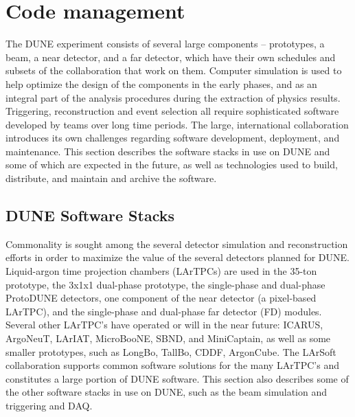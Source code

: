 %

\chapter{Code management} %
\label{chap:codemgt}

The DUNE experiment consists of several large components -- prototypes, a beam, a near detector, and a far detector,
which have their own schedules and subsets of the collaboration that work on them.  Computer simulation is used to
help optimize the design of the components in the early phases, and as an integral part of the analysis procedures
during the extraction of physics results.  Triggering, reconstruction and event selection all require sophisticated
software developed by teams over long time periods.  The large, international
collaboration introduces its own challenges regarding software development, deployment, and maintenance.
This section describes the software stacks in use on DUNE and some of which are expected in the future,
as well as technologies used to build, distribute, and maintain and archive the software.

\section{DUNE Software Stacks}

Commonality is sought among the several detector simulation and reconstruction efforts in order to maximize the
value of the several detectors planned for DUNE.  Liquid-argon time projection chambers (LArTPCs) are used in the 35-ton
prototype, the 3x1x1 dual-phase prototype, the single-phase and dual-phase ProtoDUNE detectors, 
one component of the near detector (a pixel-based
LArTPC), and the single-phase and dual-phase far detector (FD) modules.  Several other LArTPC's have operated or will
in the near future:  ICARUS, ArgoNeuT, LArIAT, MicroBooNE, SBND, and MiniCaptain, as well as some smaller prototypes,
such as LongBo, TallBo, CDDF, ArgonCube.  The LArSoft collaboration supports common software solutions for the
many LArTPC's and constitutes a large portion of DUNE software.  This section also describes some of the other
software stacks in use on DUNE, such as the beam simulation and triggering and DAQ.

